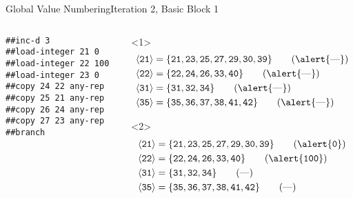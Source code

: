 \documentclass{beamer}
\newcommand{\vn}[1]{\ensuremath{\langle\texttt{#1}\rangle}}
\newcommand{\vreg}[1]{\texttt{#1}}
\begin{document}
\begin{frame}[fragile]{Global Value Numbering}{Iteration 2, Basic Block 1}
  \footnotesize
  \begin{columns}[t,onlytextwidth]
    \begin{column}[t]{.5\textwidth}
      \begin{Verbatim}[frame=single]
##inc-d 3
##load-integer 21 0
##load-integer 22 100
##load-integer 23 0
##copy 24 22 any-rep
##copy 25 21 any-rep
##copy 26 24 any-rep
##copy 27 23 any-rep
##branch
      \end{Verbatim}
    \end{column}
    \begin{column}{.5\textwidth}
      \begin{onlyenv}<1>
        \begin{align*}
          \vn{21} &= \{\vreg{21},
                       \vreg{23},
                       \vreg{25},
                       \vreg{27},
                       \vreg{29},
                       \vreg{30},
                       \vreg{39}\} \tag{\alert{---}} \\
          \vn{22} &= \{\vreg{22},
                       \vreg{24},
                       \vreg{26},
                       \vreg{33},
                       \vreg{40}\} \tag{\alert{---}} \\
          \vn{31} &= \{\vreg{31},
                       \vreg{32},
                       \vreg{34}\} \tag{\alert{---}} \\
          \vn{35} &= \{\vreg{35},
                       \vreg{36},
                       \vreg{37},
                       \vreg{38},
                       \vreg{41},
                       \vreg{42}\} \tag{\alert{---}}
        \end{align*}
      \end{onlyenv}
      \begin{onlyenv}<2>
        \begin{align*}
          \vn{21} &= \{\vreg{21},
                       \vreg{23},
                       \vreg{25},
                       \vreg{27},
                       \vreg{29},
                       \vreg{30},
                       \vreg{39}\} \tag{\alert{\texttt{0}}} \\
          \vn{22} &= \{\vreg{22},
                       \vreg{24},
                       \vreg{26},
                       \vreg{33},
                       \vreg{40}\} \tag{\alert{\texttt{100}}} \\
          \vn{31} &= \{\vreg{31},
                       \vreg{32},
                       \vreg{34}\} \tag{---} \\
          \vn{35} &= \{\vreg{35},
                       \vreg{36},
                       \vreg{37},
                       \vreg{38},
                       \vreg{41},
                       \vreg{42}\} \tag{---}
        \end{align*}
      \end{onlyenv}
    \end{column}
  \end{columns}
\end{frame}
\end{document}
